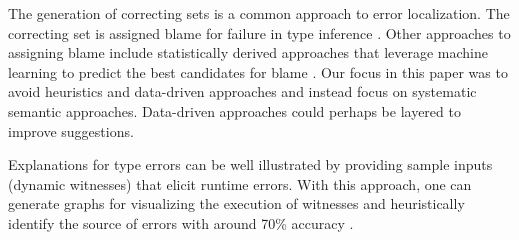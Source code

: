 
The generation of correcting sets is a common approach to error localization. The correcting set is assigned blame for failure in type inference \cite{sherrloc, typeinferDif, Pavlinovic2015}. Other approaches to assigning blame include statistically derived approaches that leverage machine learning to predict the best candidates for blame \cite{SeidelBlame}. Our focus in this paper was to avoid heuristics and data-driven approaches and instead focus on systematic semantic approaches. Data-driven approaches could perhaps be layered to improve suggestions.

Explanations for type errors can be well illustrated by providing sample inputs (dynamic witnesses) that elicit runtime errors. With this approach, one can generate graphs for visualizing the execution of witnesses and heuristically identify the source of errors with around 70\% accuracy \cite{Seidel2016}.